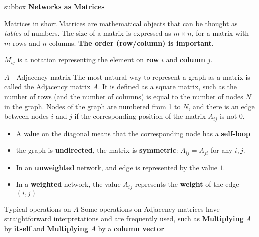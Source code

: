 \documentclass[a4paper,11pt]{book}
\begin{document}

\newpage



\begin{subbox}{subbox}{}
\centering
\Large{\textbf{Networks as Matrices}}
\end{subbox}


\begin{textbox}{Matrices in short}
Matrices are mathematical objects that can be thought as \textit{tables} of numbers. The size of a matrix is expressed as $m \times n$, for a matrix with $m$ rows and $n$ columns. \textbf{The order (row/column) is important}.

\textbf{$M_{ij}$} is a notation representing the element on \textbf{row} $i$ and \textbf{column} $j$.


\end{textbox}

\begin{textbox}{$A$ - Adjacency matrix}
The most natural way to represent a graph as a matrix is called the Adjacency matrix $A$. It is defined as a square matrix, such as the number of rows (and the number of columns) is equal to the number of nodes $N$ in the graph. Nodes of the graph are numbered from 1 to $N$, and there is an edge between nodes $i$ and $j$ if the corresponding position of the matrix $A_{ij}$ is not $0$.

\begin{itemize}
    \item A value on the diagonal means that the corresponding node has a \textbf{self-loop}
    \item the graph is \textbf{undirected}, the matrix is \textbf{symmetric}: $A_{ij}=A_{ji}$ for any $i,j$.
    \item In an \textbf{unweighted} network, and edge is represented by the value $1$.
    \item In a \textbf{weighted} network, the value $A_{ij}$ represents the \textbf{weight} of the edge $(i,j)$

\end{itemize}
\end{textbox}


\begin{textbox}{Typical operations on $A$}
Some operations on Adjacency matrices have straightforward interpretations and are frequently used, such as \textbf{Multiplying} $A$ by \textbf{itself} and \textbf{Multiplying} $A$ by a \textbf{column vector}
\end{textbox}
\end{document}
